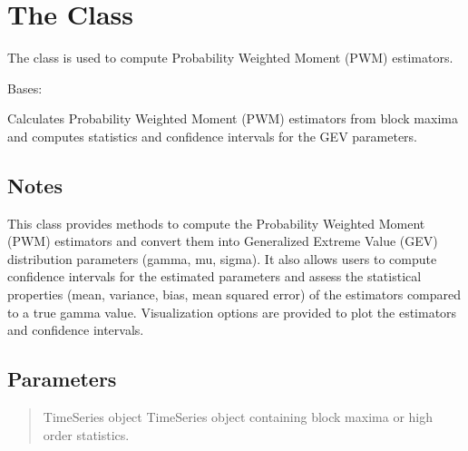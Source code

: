 \documentclass[a4paper,11pt,openany,english]{sphinxmanual}
\begin{document}
\section{The  Class}
\label{\detokenize{api_topt:the-pwm-estimators-class}}
\sphinxAtStartPar
The  class is used to compute Probability Weighted Moment (PWM) estimators.

\begin{fulllineitems}
\label{\detokenize{api_topt:xtremes.topt.PWM_estimators}}
\pysigstartsignatures
{}
\pysigstopsignatures
\sphinxAtStartPar
Bases: 

\sphinxAtStartPar
Calculates Probability Weighted Moment (PWM) estimators from block maxima and computes statistics and confidence intervals for the GEV parameters.


\subsection{Notes}
\label{\detokenize{api_topt:id22}}
\sphinxAtStartPar
This class provides methods to compute the Probability Weighted Moment (PWM) estimators and convert them into Generalized Extreme Value (GEV) 
distribution parameters (gamma, mu, sigma). It also allows users to compute confidence intervals for the estimated parameters and assess 
the statistical properties (mean, variance, bias, mean squared error) of the estimators compared to a true gamma value. Visualization options 
are provided to plot the estimators and confidence intervals.


\subsection{Parameters}
\label{\detokenize{api_topt:id23}}\begin{quote}\begin{description}
\sphinxAtStartPar
TimeSeries object
TimeSeries object containing block maxima or high order statistics.


\end{description}
\end{quote}
\end{fulllineitems}
\end{document}
